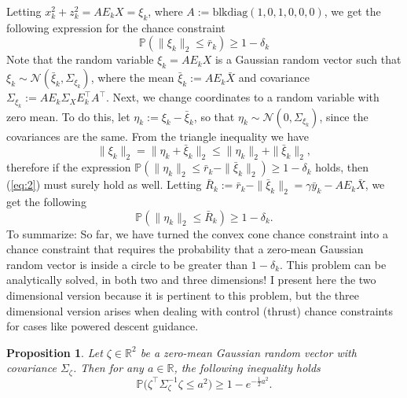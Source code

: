\documentclass[12pt]{article}
\newtheorem{prop}{Proposition}
\begin{document}
Letting $x_k^2 + z_k^2 = AE_k X = \xi_k$, where $A := \text{blkdiag}(1,0,1,0,0,0)$, we get the following expression for the chance constraint
\begin{equation}\label{eq:2}
\mathbb{P}(\|\xi_k\|_2 \leq \bar{r}_k) \geq 1 - \delta_k
\end{equation}
Note that the random variable $\xi_k = AE_k X$ is a Gaussian random vector such that $\xi_k \sim \mathcal{N}(\bar{\xi}_k,\Sigma_{\xi_k})$, where the mean $\bar{\xi}_k := AE_k\bar{X}$ and covariance $\Sigma_{\xi_k} := AE_k\Sigma_XE_k^\intercal A^\intercal$. 
Next, we change coordinates to a random variable with zero mean. To do this, let $\eta_k := \xi_k - \bar{\xi}_k$, so that $\eta_k \sim \mathcal{N}(0,\Sigma_{\xi_k})$, since the covariances are the same. 
From the triangle inequality we have
\begin{equation}
\|\xi_k\|_2 = \|\eta_k + \bar{\xi}_k\|_2 \leq \|\eta_k\|_2 + \|\bar{\xi}_k\|_2,
\end{equation}
therefore if the expression $\mathbb{P}(\|\eta_k\|_2 \leq \bar{r}_k - \|\bar{\xi}_k\|_2) \geq 1 - \delta_k$ holds, then (\ref{eq:2}) must surely hold as well.
Letting $\bar{R}_k := \bar{r}_k - \|\bar{\xi}_k\|_2 = \gamma\bar{y}_k - AE_k\bar{X}$, we get the following 
\begin{equation}\label{eq:4}
\mathbb{P}(\|\eta_k\|_2 \leq \bar{R}_k) \geq 1 - \delta_k.
\end{equation}
To summarize: So far, we have turned the convex cone chance constraint into a chance constraint that requires the probability that a zero-mean Gaussian random vector is inside a circle to be greater than $1 - \delta_k$. 
This problem can be analytically solved, in both two and three dimensions! 
I present here the two dimensional version because it is pertinent to this problem, but the three dimensional version arises when dealing with control (thrust) chance constraints for cases like powered descent guidance.
\begin{prop}
	Let $\zeta\in\mathbb{R}^2$ be a zero-mean Gaussian random vector with covariance $\Sigma_{\zeta}$. Then for any $a\in\mathbb{R}$, the following inequality holds
	\begin{equation}\label{eq:5}
	\mathbb{P}\big(\zeta^\intercal \Sigma_{\zeta}^{-1}\zeta \leq a^2\big) \geq 1 - e^{-\frac{1}{2}a^2}.
	\end{equation}
\end{prop}
\end{document}
